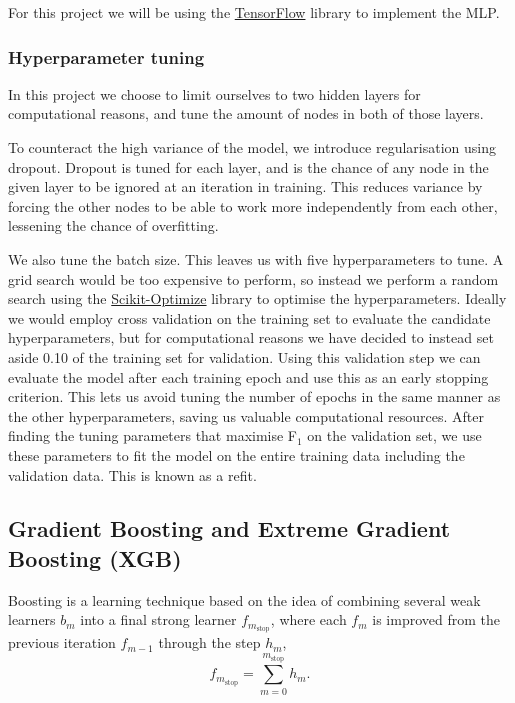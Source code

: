 \documentclass[a4paper, 11pt, twocolumn]{article}
\begin{document}
For this project we will be using the \href{https://www.tensorflow.org/}
{TensorFlow} library to implement the MLP.

\subsubsection{Hyperparameter tuning}
In this project we choose to limit ourselves to two hidden layers for 
computational reasons, and tune the amount of nodes in both of those layers.

To counteract the high variance of the model, we introduce regularisation using 
dropout. Dropout is tuned for each layer, and is the chance of any node in the 
given layer to be ignored at an iteration in training. This reduces variance by 
forcing the other nodes to be able to work more independently from each other, 
lessening the chance of overfitting.

We also tune the batch size. This leaves us with five hyperparameters to tune. A 
grid search would be too expensive to perform, so instead we perform a random
search using the \href{https://scikit-optimize.github.io/}{Scikit-Optimize} 
library to optimise the hyperparameters.
Ideally we would employ cross validation on the training set to evaluate the 
candidate hyperparameters, but for computational reasons we have decided to 
instead set aside 0.10 of the training set for validation. Using this validation 
step we can evaluate the model after each training epoch and use this as an early 
stopping criterion. This lets us avoid tuning the number of epochs in the same 
manner as the other hyperparameters, saving us valuable computational resources. 
After finding the tuning parameters that maximise F$_1$ on the validation set, we 
use these parameters to fit the model on the entire training data including the 
validation data. This is known as a refit. 


\subsection{Gradient Boosting and Extreme Gradient Boosting (XGB)}
Boosting is a learning technique based on the idea of combining several weak
learners $b_m$ into a final strong learner $f_{m_\text{stop}}$, where each
$f_m$ is improved from the previous iteration $f_{m-1}$ through the step $h_m$, 
\begin{equation}
      f_{m_\text{stop}} = \sum_{m=0}^{m_\text{stop}} h_m.
\end{equation}
\end{document}

